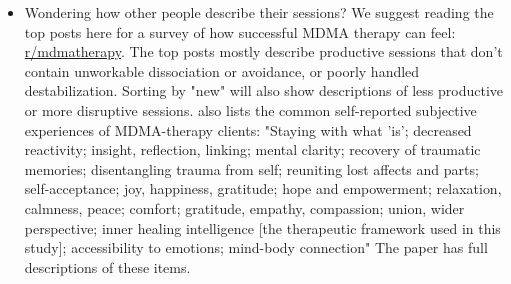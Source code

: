 \documentclass[12pt,letterpaper]{book}
\begin{document}
\begin{itemize}
    \item Wondering how other people describe their sessions? We suggest reading the top posts here for a survey of how successful MDMA therapy can feel: \href{https://old.reddit.com/r/mdmatherapy/top/?sort=top&t=all}{r/mdmatherapy}. The top posts mostly describe productive sessions that don't contain unworkable dissociation or avoidance, or poorly handled destabilization. Sorting by "new" will also show descriptions of less productive or more disruptive sessions. \textcite{godes2023perceived} also lists the common self-reported subjective experiences of MDMA-therapy clients: "Staying with what 'is'; decreased reactivity; insight, reflection, linking; mental clarity; recovery of traumatic memories; disentangling trauma from self; reuniting lost affects and parts; self-acceptance; joy, happiness, gratitude; hope and empowerment; relaxation, calmness, peace; comfort; gratitude, empathy, compassion; union, wider perspective; inner healing intelligence [the therapeutic framework used in this study]; accessibility to emotions; mind-body connection" The paper has full descriptions of these items.
\end{itemize}
\end{document}
